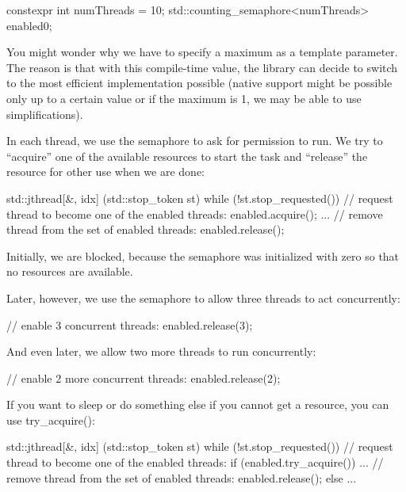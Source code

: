 \begin{cpp}
constexpr int numThreads = 10;
std::counting_semaphore<numThreads> enabled{0};
\end{cpp}

You might wonder why we have to specify a maximum as a template parameter. The reason is that with this compile-time value, the library can decide to switch to the most efficient implementation possible (native support might be possible only up to a certain value or if the maximum is 1, we may be able to use simplifications).

In each thread, we use the semaphore to ask for permission to run. We try to “acquire” one of the available resources to start the task and “release” the resource for other use when we are done:

\begin{cpp}
std::jthread{[&, idx] (std::stop_token st) {
				while (!st.stop_requested()) {
					// request thread to become one of the enabled threads:
					enabled.acquire();
					...
					// remove thread from the set of enabled threads:
					enabled.release();
				}
		}}
\end{cpp}

Initially, we are blocked, because the semaphore was initialized with zero so that no resources are available.

Later, however, we use the semaphore to allow three threads to act concurrently:

\begin{cpp}
// enable 3 concurrent threads:
enabled.release(3);
\end{cpp}

And even later, we allow two more threads to run concurrently:

\begin{cpp}
// enable 2 more concurrent threads:
enabled.release(2);
\end{cpp}

If you want to sleep or do something else if you cannot get a resource, you can use try\_acquire():

\begin{cpp}
std::jthread{[&, idx] (std::stop_token st) {
				while (!st.stop_requested()) {
					// request thread to become one of the enabled threads:
					if (enabled.try_acquire()) {
						...
						// remove thread from the set of enabled threads:
						enabled.release();
					}
					else {
						...
					}
				}
		}}
\end{cpp}

